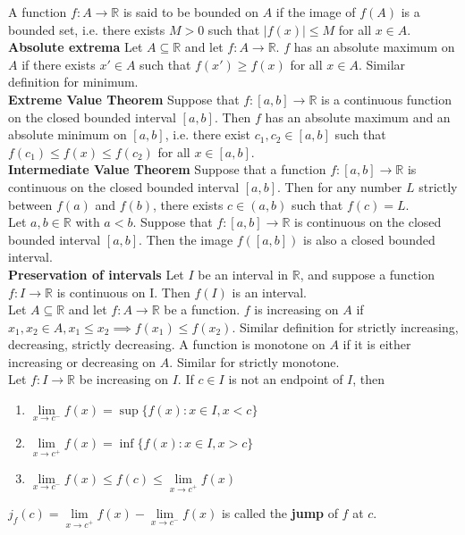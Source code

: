\documentclass[10pt,landscape]{article}
\begin{document}
\begin{multicols}{3}
A function $f:A\to\mathbb{R}$ is said to be bounded on  $A$ if the image of  $f(A)$ is a bounded set, i.e. there exists  $M>0$ such that  $|f(x)|\leq M$ for all  $x\in A$.\\
\textbf{Absolute extrema} Let  $A\subseteq\mathbb{R}$ and let  $f:A\to\mathbb{R}$.  $f$ has an absolute maximum on  $A$ if there exists  $x'\in A$ such that  $f(x')\geq f(x)$ for all  $x\in A$. Similar definition for minimum.\\
\textbf{Extreme Value Theorem} Suppose that  $f:[a,b]\to\mathbb{R}$ is a continuous function on the closed bounded interval  $[a,b]$. Then  $f$ has an absolute maximum and an absolute minimum on  $[a,b]$, i.e. there exist  $c_1, c_2\in[a,b]$ such that $f(c_1)\leq f(x)\leq f(c_2)$ for all $x\in[a,b]$.\\
\textbf{Intermediate Value Theorem} Suppose that a function $f:[a,b]\to\mathbb{R}$ is continuous on the closed bounded interval  $[a,b]$. Then for any number  $L$ strictly between  $f(a)$ and $f(b)$, there exists  $c\in(a,b)$ such that  $f(c)=L$.\\
Let  $a,b\in\mathbb{R}$ with  $a<b$. Suppose that  $f:[a,b]\to\mathbb{R}$ is continuous on the closed bounded interval  $[a,b]$. Then the image  $f([a,b])$ is also a closed bounded interval.\\
\textbf{Preservation of intervals} Let  $I$ be an interval in  $\mathbb{R}$, and suppose a function  $f: I\to\mathbb{R}$ is continuous on I. Then  $f(I)$ is an interval.\\
Let $A\subseteq\mathbb{R}$ and let  $f:A\to\mathbb{R}$ be a function.  $f$ is increasing on  $A$ if  $x_1,x_2\in A,x_1\leq x_2\implies f(x_1)\leq f(x_2)$. Similar definition for strictly increasing, decreasing, strictly decreasing. A function is monotone on $A$ if it is either increasing or decreasing on  $A$. Similar for strictly monotone.\\
Let  $f:I\to\mathbb{R}$ be increasing on  $I$. If  $c\in I$ is not an endpoint of  $I$, then
 \begin{enumerate}
	 \item $\lim\limits_{x\to c^-}f(x)=\sup\{f(x):x\in I,x<c\}$
	 \item  $\lim\limits_{x\to c^+}f(x)=\inf\{f(x):x\in I,x>c\}$
	 \item $\lim\limits_{x\to c^-}f(x)\leq f(c)\leq\lim\limits_{x\to c^+}f(x)$
\end{enumerate}
$j_f(c)=\lim\limits_{x\to c^+}f(x)-\lim\limits_{x\to c^-}f(x)$ is called the \textbf{jump} of  $f$ at  $c$.\\

\end{multicols}
\end{document}

